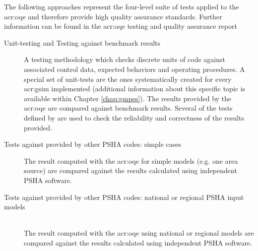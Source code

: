 The following approaches represent the four-level suite of tests applied to the
\gls{acr:oqe} and therefore provide high quality assurance standards. Further
information can be found in the \gls{acr:oqe} testing and quality assurance
report \citep{pagani2014_oqtesting} 
%
\begin{description}
    \item [Unit-testing and Testing against benchmark results] 
        A testing methodology which checks discrete units of code against
        associated control data, expected behaviors and operating procedures. A
        special set of unit-tests are the ones systematically created for every
        \gls{acr:gsim} implemented (additional information about this specific
        topic is available within Chapter \ref{chap:gmpes}).  The results
        provided by the \gls{acr:oqe} are compared against benchmark results.
        Several of the tests defined by \textcite{thomas2010} are used to check
        the reliability and correctness of the results provided. 
    \item [Tests against provided by other PSHA codes: simple cases] 
        The result computed with the \gls{acr:oqe} for simple models (e.g. one
        area source) are compared against the results calculated using 
        independent PSHA software.
    \item [Tests against provided by other PSHA codes: national or regional 
        PSHA input models] \hfill \\ The result computed with the \gls{acr:oqe} 
        using national or regional models are compared against the 
        results calculated using independent PSHA software.
\end{description}
%
%
%
%
%
